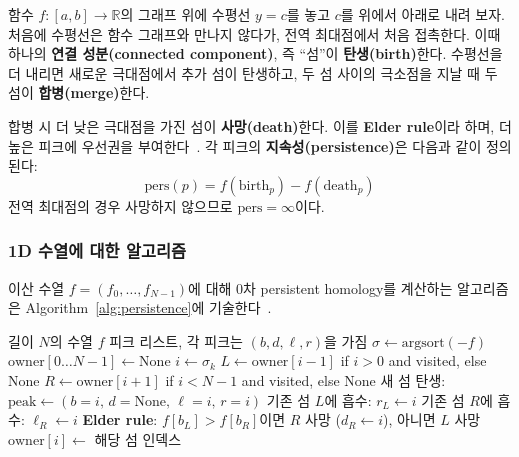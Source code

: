 \documentclass[11pt]{article}
\begin{document}
함수 $f: [a, b] \to \mathbb{R}$의 그래프 위에 수평선 $y = c$를 놓고 $c$를 위에서 아래로 내려 보자.
처음에 수평선은 함수 그래프와 만나지 않다가, 전역 최대점에서 처음 접촉한다.
이때 하나의 \textbf{연결 성분(connected component)}, 즉 ``섬''이 \textbf{탄생(birth)}한다.
수평선을 더 내리면 새로운 극대점에서 추가 섬이 탄생하고, 두 섬 사이의 극소점을 지날 때 두 섬이 \textbf{합병(merge)}한다.

합병 시 더 낮은 극대점을 가진 섬이 \textbf{사망(death)}한다.
이를 \textbf{Elder rule}이라 하며, 더 높은 피크에 우선권을 부여한다~\cite{Edelsbrunner2010}.
각 피크의 \textbf{지속성(persistence)}은 다음과 같이 정의된다:
\begin{equation}
  \mathrm{pers}(p) = f(\mathrm{birth}_p) - f(\mathrm{death}_p)
  \label{eq:persistence}
\end{equation}
전역 최대점의 경우 사망하지 않으므로 $\mathrm{pers} = \infty$이다.

\subsubsection{1D 수열에 대한 알고리즘}

이산 수열 $f = (f_0, \ldots, f_{N-1})$에 대해 0차 persistent homology를 계산하는 알고리즘은 Algorithm~\ref{alg:persistence}에 기술한다~\cite{Huber2021}.

\begin{algorithm}[h]
\caption{0th Persistent Homology for 1D Sequence}
\label{alg:persistence}
\begin{algorithmic}[1]
\REQUIRE 길이 $N$의 수열 $f$
\ENSURE 피크 리스트, 각 피크는 $(b, d, \ell, r)$을 가짐
\STATE $\sigma \leftarrow \mathrm{argsort}(-f)$ 
\STATE $\mathrm{owner}[0 \ldots N-1] \leftarrow \mathrm{None}$
  \STATE $i \leftarrow \sigma_k$
  \STATE $L \leftarrow \mathrm{owner}[i-1]$ if $i > 0$ and visited, else $\mathrm{None}$
  \STATE $R \leftarrow \mathrm{owner}[i+1]$ if $i < N-1$ and visited, else $\mathrm{None}$
    \STATE 새 섬 탄생: $\mathrm{peak} \leftarrow (b=i,\, d=\mathrm{None},\, \ell=i,\, r=i)$
    \STATE 기존 섬 $L$에 흡수: $r_L \leftarrow i$
    \STATE 기존 섬 $R$에 흡수: $\ell_R \leftarrow i$
  \ELSE
    \STATE \textbf{Elder rule}: $f[b_L] > f[b_R]$이면 $R$ 사망 ($d_R \leftarrow i$), 아니면 $L$ 사망
  \ENDIF
  \STATE $\mathrm{owner}[i] \leftarrow$ 해당 섬 인덱스
\ENDFOR
\end{algorithmic}
\end{algorithm}
\end{document}
